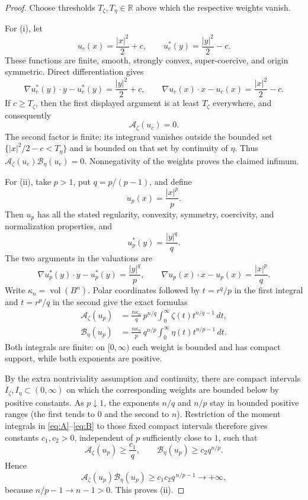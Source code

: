 \documentclass[11pt]{amsart}
\theoremstyle{remark}
\newcommand{\R}{\mathbb R}
\newcommand{\A}{\mathcal A}
\newcommand{\B}{\mathcal B}
\newcommand{\vol}{\operatorname{vol}}
\begin{document}
\begin{proof}
Choose thresholds $T_\zeta,T_\eta\in\R$ above which the respective weights
vanish.

For (i), let
\[
       u_c(x)=\frac{|x|^2}{2}+c,
       \qquad
       u_c^*(y)=\frac{|y|^2}{2}-c.
\]
These functions are finite, smooth, strongly convex, super-coercive, and
origin symmetric.  Direct differentiation gives
\[
 \nabla u_c^*(y)\cdot y-u_c^*(y)
      =\frac{|y|^2}{2}+c,
 \qquad
 \nabla u_c(x)\cdot x-u_c(x)
      =\frac{|x|^2}{2}-c.
\]
If $c\geq T_\zeta$, then the first displayed argument is at least
$T_\zeta$ everywhere, and consequently
\[
       \A_\zeta(u_c)=0.
\]
The second factor is finite: its integrand vanishes outside the bounded set
$\{|x|^2/2-c<T_\eta\}$ and is bounded on that set by continuity of $\eta$.
Thus $\A_\zeta(u_c)\B_\eta(u_c)=0$.  Nonnegativity of the weights proves the
claimed infimum.

For (ii), take $p>1$, put $q=p/(p-1)$, and define
\[
       u_p(x)=\frac{|x|^p}{p}.
\]
Then $u_p$ has all the stated regularity, convexity, symmetry, coercivity,
and normalization properties, and
\[
       u_p^*(y)=\frac{|y|^q}{q}.
\]
The two arguments in the valuations are
\[
 \nabla u_p^*(y)\cdot y-u_p^*(y)=\frac{|y|^q}{p},
 \qquad
 \nabla u_p(x)\cdot x-u_p(x)=\frac{|x|^p}{q}.
\]
Write $\kappa_n=\vol(B^n)$.  Polar coordinates followed by
$t=r^q/p$ in the first integral and $t=r^p/q$ in the second give the exact
formulas
\begin{align}
\A_\zeta(u_p)
 &=\frac{n\kappa_n}{q}\,p^{n/q}
   \int_0^\infty \zeta(t)t^{n/q-1}\,dt,
\label{eq:A}\\
\B_\eta(u_p)
 &=\frac{n\kappa_n}{p}\,q^{n/p}
   \int_0^\infty \eta(t)t^{n/p-1}\,dt.
\label{eq:B}
\end{align}
Both integrals are finite: on $[0,\infty)$ each weight is bounded and has
compact support, while both exponents are positive.

By the extra nontriviality assumption and continuity, there are compact
intervals $I_\zeta,I_\eta\subset(0,\infty)$ on which the corresponding
weights are bounded below by positive constants.  As $p\downarrow1$,
the exponents $n/q$ and $n/p$ stay in bounded positive ranges (the first
tends to $0$ and the second to $n$).  Restriction of the moment integrals in
\eqref{eq:A}--\eqref{eq:B} to those fixed compact intervals therefore gives
constants $c_1,c_2>0$, independent of $p$ sufficiently close to $1$, such
that
\[
       \A_\zeta(u_p)\geq \frac{c_1}{q},
       \qquad
       \B_\eta(u_p)\geq c_2 q^{n/p}.
\]
Hence
\[
       \A_\zeta(u_p)\B_\eta(u_p)
          \geq c_1c_2 q^{\,n/p-1}\longrightarrow+\infty,
\]
because $n/p-1\to n-1>0$.  This proves (ii).
\end{proof}
\end{document}
